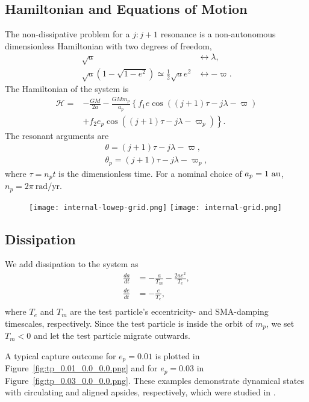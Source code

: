 \documentclass[usenatbib,twocolumn]{mnras}
\begin{document}
\subsection{Hamiltonian and Equations of Motion}
The non-dissipative problem for a $j:j+1$ resonance is a non-autonomous dimensionless Hamiltonian with two degrees of freedom,
\begin{align}
    \sqrt{a} &\longleftrightarrow \lambda,\\
    \sqrt{a}(1-\sqrt{1-e^2})\simeq \frac12\sqrt{a}e^2&\longleftrightarrow -\varpi.
\end{align}
The Hamiltonian of the system is 
\begin{align}
    \label{eq:TPH}
    \mathcal H=&-\frac{GM}{2a}
    -\frac{GMm_p}{a_p}\left\{
        f_1e\cos((j+1)\tau-j\lambda-\varpi)\right.\\
        &\left. +f_2e_p\cos((j+1)\tau-j\lambda-\varpi_p)
    \right\}.\nonumber
\end{align}
The resonant arguments are 
\begin{align}
    \theta=(j+1)\tau -j\lambda-\varpi,\\
    \theta_p=(j+1)\tau -j\lambda-\varpi_p,
\end{align}
where $\tau=n_p t$ is the dimensionless time. For a nominal choice of $a_p=1~\rm{au}$, $n_p = 2\pi~\mathrm{rad}/\mathrm{yr}$.

\begin{figure}
    \texttt{[image: internal-lowep-grid.png]}
    \texttt{[image: internal-grid.png]}
\end{figure}

\subsection{Dissipation}
We add dissipation to the system as
\begin{align}
 \frac{da}{dt}&=- \frac{a}{T_{m}} - \frac{2 a e^{2}}{T_{e}},\\
 \frac{de}{dt}&=- \frac{e}{T_{e}},\\
\end{align}
where $T_e$ and $T_m$ are the test particle's eccentricity- and SMA-damping timescales, respectively. Since the test particle is inside the orbit of $m_p$, we set $T_m<0$ and let the test particle migrate outwards.

A typical capture outcome for $e_p=0.01$ is plotted in Figure~\ref{fig:tp_0.01_0.0_0.0.png} and for $e_p=0.03$ in Figure~\ref{fig:tp_0.03_0.0_0.0.png}. These examples demonstrate dynamical states with circulating and aligned apsides, respectively, which were studied in \cite{laune22_apsid_align_anti_align_planet}.
\end{document}
